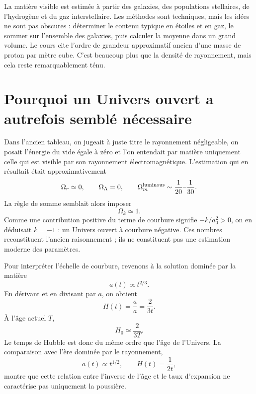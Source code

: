 La matière visible est estimée à partir des galaxies, des populations stellaires, de l’hydrogène et du gaz interstellaire. Les méthodes sont techniques, mais les idées ne sont pas obscures : déterminer le contenu typique en étoiles et en gaz, le sommer sur l’ensemble des galaxies, puis calculer la moyenne dans un grand volume. Le cours cite l’ordre de grandeur approximatif ancien d’une masse de proton par mètre cube. C’est beaucoup plus que la densité de rayonnement, mais cela reste remarquablement ténu.

\begin{classroomqa}
\end{classroomqa}

\section{Pourquoi un Univers ouvert a autrefois semblé nécessaire}

Dans l’ancien tableau, on jugeait à juste titre le rayonnement négligeable, on posait l’énergie du vide égale à zéro et l’on entendait par matière uniquement celle qui est visible par son rayonnement électromagnétique. L’estimation qui en résultait était approximativement
\begin{equation}
\Omega_r\simeq0,
\qquad
\Omega_\Lambda=0,
\qquad
\Omega_m^{\rm luminous}\sim\frac{1}{20}\text{--}\frac{1}{30}.
\end{equation}
La règle de somme semblait alors imposer
\begin{equation}
\Omega_k\simeq1.
\end{equation}
Comme une contribution positive du terme de courbure signifie \(-k/a_0^2>0\), on en déduisait \(k=-1\) : un Univers ouvert à courbure négative. Ces nombres reconstituent l’ancien raisonnement ; ils ne constituent pas une estimation moderne des paramètres.

Pour interpréter l’échelle de courbure, revenons à la solution dominée par la matière
\begin{equation}
a(t)\propto t^{2/3}.
\end{equation}
En dérivant et en divisant par \(a\), on obtient
\begin{equation}
H(t)=\frac{\dot a}{a}=\frac{2}{3t}.
\label{eq:c06-matter-h}
\end{equation}
À l’âge actuel \(T\),
\begin{equation}
H_0\simeq\frac{2}{3T}.
\end{equation}
Le temps de Hubble est donc du même ordre que l’âge de l’Univers. La comparaison avec l’ère dominée par le rayonnement,
\begin{equation}
a(t)\propto t^{1/2},
\qquad
H(t)=\frac{1}{2t},
\end{equation}
montre que cette relation entre l’inverse de l’âge et le taux d’expansion ne caractérise pas uniquement la poussière.

